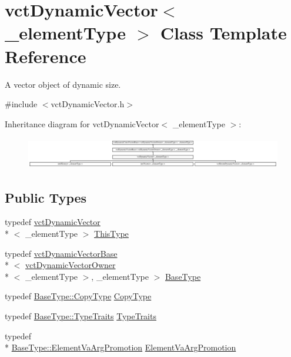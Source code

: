 \hypertarget{classvct_dynamic_vector}{\section{vct\-Dynamic\-Vector$<$ \-\_\-element\-Type $>$ Class Template Reference}
\label{classvct_dynamic_vector}
}


A vector object of dynamic size.  




{\ttfamily \#include $<$vct\-Dynamic\-Vector.\-h$>$}

Inheritance diagram for vct\-Dynamic\-Vector$<$ \-\_\-element\-Type $>$\-:\begin{figure}[H]
\begin{center}
\leavevmode
\includegraphics[height=1.385281cm]{d8/d36/classvct_dynamic_vector}
\end{center}
\end{figure}
\subsection*{Public Types}
\begin{DoxyCompactItemize}
\item 
typedef \hyperlink{classvct_dynamic_vector}{vct\-Dynamic\-Vector}\\*
$<$ \-\_\-element\-Type $>$ \hyperlink{classvct_dynamic_vector_a35327e01975af9fc9db8d93a4a27370f}{This\-Type}
\item 
typedef \hyperlink{classvct_dynamic_vector_base}{vct\-Dynamic\-Vector\-Base}\\*
$<$ \hyperlink{classvct_dynamic_vector_owner}{vct\-Dynamic\-Vector\-Owner}\\*
$<$ \-\_\-element\-Type $>$, \-\_\-element\-Type $>$ \hyperlink{classvct_dynamic_vector_aab0ea4a1ec16f7694beb39869ab780bf}{Base\-Type}
\item 
typedef \hyperlink{classvct_dynamic_vector_base_a62fcc6341849207c5273566d0bce3cf5}{Base\-Type\-::\-Copy\-Type} \hyperlink{classvct_dynamic_vector_a924a58839df36234b070c7d06f875079}{Copy\-Type}
\item 
typedef \hyperlink{classvct_dynamic_vector_base_ae5ebb885e67454fa18cb8101f1acc8dd}{Base\-Type\-::\-Type\-Traits} \hyperlink{classvct_dynamic_vector_ad0c3e6e940b18c5c1d014aac726ad7de}{Type\-Traits}
\item 
typedef \\*
\hyperlink{classvct_dynamic_vector_base_a74f36531adfd7ec68ac6500176134156}{Base\-Type\-::\-Element\-Va\-Arg\-Promotion} \hyperlink{classvct_dynamic_vector_a7f290da80b23d4dd6bcc61d7db77aa75}{Element\-Va\-Arg\-Promotion}
\end{DoxyCompactItemize}
